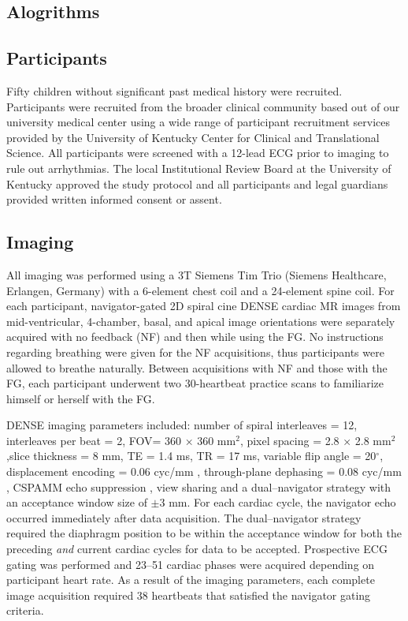 \subsection{Alogrithms}



\subsection{Participants}
	Fifty children without significant past medical history were recruited. Participants were recruited from the broader clinical community based out of our university medical center using a wide range of participant recruitment services provided by the University of Kentucky Center for Clinical and Translational Science. All participants were screened with a 12-lead ECG prior to imaging to rule out arrhythmias. The local Institutional Review Board at the University of Kentucky approved the study protocol and all participants and legal guardians provided written informed consent or assent.

\subsection{Imaging}
	All imaging was performed using a 3T Siemens Tim Trio (Siemens Healthcare, Erlangen, Germany) with a 6-element chest coil and a 24-element spine coil. For each participant, navigator-gated 2D spiral cine DENSE cardiac MR \cite{Zhong2010a,Wehner2015} images from mid-ventricular, 4-chamber, basal, and apical image orientations were separately acquired with no feedback (NF) and then while using the FG. No instructions regarding breathing were given for the NF acquisitions, thus participants were allowed to breathe naturally. Between acquisitions with NF and those with the FG, each participant underwent two 30-heartbeat practice scans to familiarize himself or herself with the FG.
	
	DENSE imaging parameters included: number of spiral interleaves = 12, interleaves per beat = 2, FOV= 360 × 360 mm$^2$, pixel spacing = 2.8 × 2.8 mm$^2$,slice thickness = 8 mm, TE = 1.4 ms, TR = 17 ms, variable flip angle = 20$^{\circ}$, displacement encoding = 0.06 cyc/mm \cite{Wehner2015a}, through-plane dephasing = 0.08 cyc/mm \cite{Zhong2006a}, CSPAMM echo suppression \cite{Kim2004}, view sharing and a dual--navigator strategy \cite{Hamlet2016a} with an acceptance window size of $\pm$3 mm. For each cardiac cycle, the navigator echo occurred immediately after data acquisition. The dual--navigator strategy required the diaphragm position to be within the acceptance window for both the preceding \textit{and} current cardiac cycles for data to be accepted. Prospective ECG gating was performed and 23--51 cardiac phases were acquired depending on participant heart rate. As a result of the imaging parameters, each complete image acquisition required 38 heartbeats that satisfied the navigator gating criteria.
	
